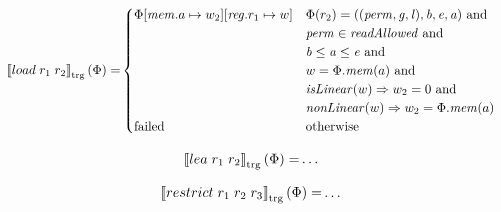 \documentclass[a4paper]{article}
\newcommand{\sem}[1]{\left\llbracket #1 \right\rrbracket}
\newcommand{\tsem}[2][\Phi]{\sem{#2}_{\mathrm{trg}}(#1)}
\newcommand{\tand}{\text{ and }}
\newcommand{\totherwise}{\text{otherwise }}
\newcommand{\targetcolor}[1]{\color{black}}
\newcommand{\trg}[1]{{\targetcolor{} #1}}
\newcommand{\zinstr}[1]{#1}
\newcommand{\twoinstr}[3]{
  \ifthenelse{\equal{#2#3}{}}
  {\zinstr{#1}}
  {\zinstr{#1} \; #2 \; #3}
}
\newcommand{\threeinstr}[4]{
  \ifthenelse{\equal{#2#3#4}{}}
  {\zinstr{#1}}
  {\zinstr{#1} \; #2 \; #3 \; #4}
}
\newcommand{\tload}[2]{\twoinstr{\trg{load}}{#1}{#2}}
\newcommand{\tlea}[2]{\twoinstr{\trg{lea}}{#1}{#2}}
\newcommand{\trestrict}[3]{\threeinstr{\trg{restrict}}{#1}{#2}{#3}}
\newcommand{\update}[2]{[#1 \mapsto #2]}
\newcommand{\updReg}[2]{\update{\reg.#1}{#2}}
\newcommand{\perm}{\var{perm}}
\newcommand{\gl}{\var{g}}
\newcommand{\lin}{\var{l}}
\newcommand{\failed}{\mathrm{failed}}
\newcommand{\var}[1]{\mathit{#1}}
\newcommand{\reg}{\var{reg}}
\newcommand{\mem}{\var{mem}}
\newcommand{\baddr}{\var{b}}
\newcommand{\eaddr}{\var{e}}
\newcommand{\aaddr}{\var{a}}
\newcommand{\plainfun}[2]{
  \ifthenelse{\equal{#2}{}}
  {\mathit{#1}}
  {\mathit{#1}(#2)}
}
\newcommand{\readAllowed}[1]{\plainfun{readAllowed}{#1}}
\newcommand{\nonLinear}[1]{\plainfun{nonLinear}{#1}}
\newcommand{\isLinear}[1]{\plainfun{isLinear}{#1}}
\begin{document}
\begin{align*}
  \tsem{\tload{r_1}{r_2}} = & 
                              \begin{cases}
                                \Phi\update{\mem.a}{w_2}\updReg{r_1}{w} &
                                \arraycolsep=0pt
                                \begin{array}[t]{l}
                                  \Phi(r_2) = ((\perm,\gl,\lin),\baddr,\eaddr,\aaddr) \tand \\
                                  \perm \in \readAllowed{} \tand \\
                                  \baddr \leq \aaddr \leq \eaddr \tand \\
                                  w = \Phi.\mem(a) \tand \\
                                  \isLinear{w} \Rightarrow w_2 = 0 \tand \\
                                  \nonLinear{w} \Rightarrow w_2 = \Phi.\mem(a)
                                \end{array} \\
                                \failed & \totherwise
                              \end{cases}
\end{align*}

\begin{align*}
  \tsem{\tlea{r_1}{r_2}} = & \dots
\end{align*}

\begin{align*}
  \tsem{\trestrict{r_1}{r_2}{r_3}} = & \dots
\end{align*}
\end{document}

